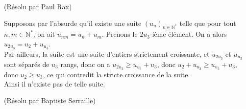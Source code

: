 \begin{sol}[75]
\begin{sol}[130]
\end{sol}

\begin{sol}[130](Résolu par Paul Rax)

Supposons par l'absurde qu'il existe une suite $(u_n)_{n \in \mathbb{N}^*}$ telle que pour tout $n,m \in \mathbb{N}^*$, on ait
$u_{nm}=u_n+u_m$. Prenons le $2u_3$-i\`eme \'el\'ement. On a alors $u_{2u_3}=u_2+u_{u_3}$.\\
Par ailleurs, la suite est une suite d'entiers strictement croissante, et $u_{2u_3}$ et $u_{u_3}$ sont s\'epar\'es de $u_3$ rangs,
donc on a $u_{2u_3} \geq u_{u_3} +u_3$, donc $u_2+u_{u_3} \geq u_{u_3} +u_3$, donc $u_2 \geq u_3$, ce qui contredit la stricte croissance de la suite.\\
Ainsi il n'existe pas de telle suite.

\end{sol}



\begin{sol}[99](Résolu par Baptiste Serraille)


\end{sol}
\end{sol}
